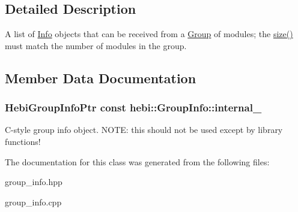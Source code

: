 \subsection{Detailed Description}
A list of \hyperlink{classhebi_1_1Info}{Info} objects that can be received from a \hyperlink{classhebi_1_1Group}{Group} of modules; the \hyperlink{classhebi_1_1GroupInfo_a197165d1017e42ebbf4f9c527bb1b706}{size()} must match the number of modules in the group. 

\subsection{Member Data Documentation}
\subsubsection[{\texorpdfstring{internal\+\_\+}{internal_}}]{\setlength{\rightskip}{0pt plus 5cm}Hebi\+Group\+Info\+Ptr const hebi\+::\+Group\+Info\+::internal\+\_\+}\hypertarget{classhebi_1_1GroupInfo_a35246a60a176870a343eb109e85fcfdf}{}\label{classhebi_1_1GroupInfo_a35246a60a176870a343eb109e85fcfdf}
C-\/style group info object. N\+O\+TE\+: this should not be used except by library functions! 

The documentation for this class was generated from the following files\+:\begin{DoxyCompactItemize}
\item 
group\+\_\+info.\+hpp\item 
group\+\_\+info.\+cpp\end{DoxyCompactItemize}
